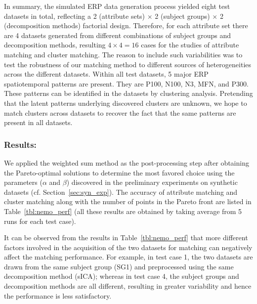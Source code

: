 In summary, the simulated ERP data generation process yielded eight test datasets in total, reflecting a 2 (attribute sets) $\times$ 2 (subject groups) $\times$ 2 (decomposition methods) factorial design. Therefore, for each attribute set there are 4 datasets generated from different combinations of subject groups and decomposition methods, resulting $4 \times 4 = 16$ cases for the studies of attribute matching and cluster matching. The reason to include such variabilities was to test the robustness of our matching method to different sources of heterogeneities across the different datasets. Within all test datasets, 5 major ERP spatiotemporal patterns are present. They are P100, N100, N3, MFN, and P300. These patterns can be identified in the datasets by clustering analysis. Pretending that the latent patterns underlying discovered clusters are unknown, we hope to match clusters across datasets to recover the fact that the same patterns are present in all datasets.

\subsubsection{Results:}
We applied the weighted sum method as the post-processing step after obtaining the Pareto-optimal solutions to determine the most favored choice using the parameters ($\alpha$ and $\beta$) discovered in the preliminary experiments on synthetic datasets (cf. Section~\ref{sec:syn_exp}). The accuracy of attribute matching and cluster matching along with the number of points in the Pareto front are listed in Table~\ref{tbl:nemo_perf} (all these results are obtained by taking average from 5 runs for each test case).


It can be observed from the results in Table~\ref{tbl:nemo_perf} that more different factors involved in the acquisition of the two datasets for matching can negatively affect the matching performance. For example, in test case 1, the two datasets are drawn from the same subject group (SG1) and preprocessed using the same decomposition method (sICA); whereas in test case 4, the subject groups and decomposition methods are all different, resulting in greater variability and hence the performance is less satisfactory.

